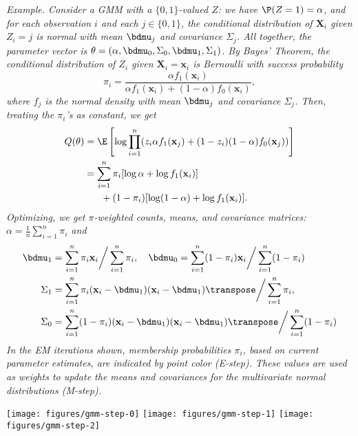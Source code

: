 \documentclass[prettycode]{worksheet}
\begin{document}
\begin{multicols*}{4}
\begin{tcolorbox}
    \textit{Example. Consider a GMM with a $\{0,1\}$-valued $Z$: we have $\P(Z = 1) = \alpha$, and for each observation $i$ and each $j \in \{0,1\}$, the conditional distribution of $\mathbf{X}_i$ given $Z_i = j$ is normal with mean $\bdmu_j$ and covariance $\Sigma_j$. All together, the parameter vector is $\theta = (\alpha, \bdmu_0, \Sigma_0, \bdmu_1, \Sigma_1)$. By Bayes' Theorem, the conditional distribution of $Z_i$ given $\mathbf{X}_i = \mathbf{x}_i$ is Bernoulli with success probability}
    \[
      \pi_i = \frac{\alpha f_1(\mathbf{x}_i)}{\alpha f_1(\mathbf{x}_i) + (1-\alpha) f_0(\mathbf{x}_i)}, 
    \]
      \textit{where $f_j$ is the normal density with mean $\bdmu_j$ and covariance $\Sigma_j$. Then, treating the $\pi_i$'s as constant, we get
    \begin{align*}
      Q(\theta) &= \E\left[\log \prod_{i=1}^n(z_i\alpha f_1(\mathbf{x}_j)+(1-z_i)(1-\alpha) f_0(\mathbf{x}_j))\right] \\
      &= \sum_{i=1}^n \pi_i[\log \alpha + \log f_1(\mathbf{x}_i)] \\ &\hspace{6mm} + 
      (1-\pi_i)[\log (1-\alpha) + \log f_1(\mathbf{x}_i)].
    \end{align*}
    Optimizing, we get $\pi$-weighted counts, means, and covariance matrices: $\alpha = \frac{1}{n}\sum_{i=1}^n \pi_i$ and 
    \begin{align*}
      \bdmu_1 &= \sum_{i=1}^n \pi_i \mathbf{x}_i\bigg/\sum_{i=1}^n \pi_i, \quad \bdmu_0 = \sum_{i=1}^n (1-\pi_i) \mathbf{x}_i\bigg/\sum_{i=1}^n (1-\pi_i) \\
      \Sigma_1 &= \sum_{i=1}^n \pi_i (\mathbf{x}_i - \bdmu_1)(\mathbf{x}_i - \bdmu_1)\transpose\bigg/\sum_{i=1}^n \pi_i, \\
      \Sigma_0 &= \sum_{i=1}^n (1-\pi_i) (\mathbf{x}_i - \bdmu_1)(\mathbf{x}_i - \bdmu_1)\transpose\bigg/\sum_{i=1}^n (1-\pi_i) 
    \end{align*}
    In the EM iterations shown, membership probabilities $\pi_i$, based on current parameter estimates, are indicated by point color (E-step). These values are used as weights to update the means and covariances for the multivariate normal distributions (M-step). 
    }
    \begin{center}
      \texttt{[image: figures/gmm-step-0]}
      \texttt{[image: figures/gmm-step-1]}
      \texttt{[image: figures/gmm-step-2]}
    \end{center}


\end{tcolorbox}
\end{multicols*}
\end{document}
